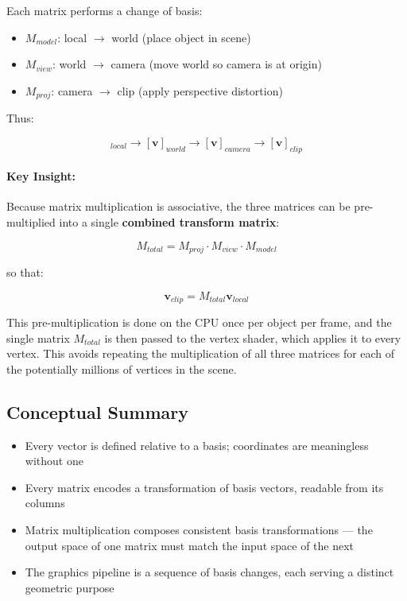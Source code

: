\documentclass[11pt]{article}
\begin{document}
Each matrix performs a change of basis:

\begin{itemize}
    \item $M_{model}$: local $\rightarrow$ world (place object in scene)
    \item $M_{view}$: world $\rightarrow$ camera (move world so camera is at origin)
    \item $M_{proj}$: camera $\rightarrow$ clip (apply perspective distortion)
\end{itemize}

Thus:

\begin{equation}
    [\mathbf{v}]_{local}
    \rightarrow
    [\mathbf{v}]_{world}
    \rightarrow
    [\mathbf{v}]_{camera}
    \rightarrow
    [\mathbf{v}]_{clip}
\end{equation}

\paragraph{Key Insight:}

Because matrix multiplication is associative, the three matrices can be pre-multiplied into a single \textbf{combined transform matrix}:

\begin{equation}
    M_{total} = M_{proj} \cdot M_{view} \cdot M_{model}
\end{equation}

so that:

\begin{equation}
    \mathbf{v}_{clip} = M_{total} \mathbf{v}_{local}
\end{equation}

This pre-multiplication is done on the CPU once per object per frame, and the single matrix $M_{total}$ is then passed to the vertex shader, which applies it to every vertex. This avoids repeating the multiplication of all three matrices for each of the potentially millions of vertices in the scene.

\subsection{Conceptual Summary}

\begin{itemize}
    \item Every vector is defined relative to a basis; coordinates are meaningless without one
    \item Every matrix encodes a transformation of basis vectors, readable from its columns
    \item Matrix multiplication composes consistent basis transformations --- the output space of one matrix must match the input space of the next
    \item The graphics pipeline is a sequence of basis changes, each serving a distinct geometric purpose
\end{itemize}
\end{document}
